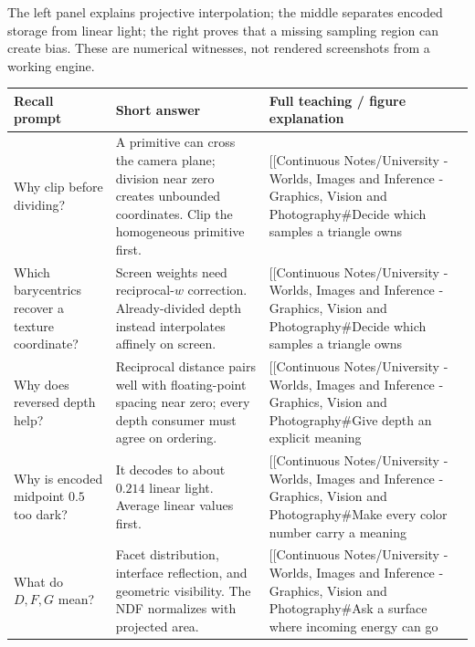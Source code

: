 The left panel explains projective interpolation; the middle separates encoded storage from linear light; the right proves that a missing sampling region can create bias. These are numerical witnesses, not rendered screenshots from a working engine.

{\def\LTcaptype{none} %
\begin{longtable}[]{@{}
  >{\raggedright\arraybackslash}p{}
  >{\raggedright\arraybackslash}p{}
  >{\raggedright\arraybackslash}p{}@{}}
\toprule\noalign{}
\begin{minipage}[b]{\linewidth}\raggedright
Recall prompt
\end{minipage} & \begin{minipage}[b]{\linewidth}\raggedright
Short answer
\end{minipage} & \begin{minipage}[b]{\linewidth}\raggedright
Full teaching / figure explanation
\end{minipage} \\
\midrule\noalign{}
\endhead
\bottomrule\noalign{}
\endlastfoot
Why clip before dividing? & A primitive can cross the camera plane; division near zero creates unbounded coordinates. Clip the homogeneous primitive first. & {[}{[}Continuous Notes/University - Worlds, Images and Inference - Graphics, Vision and Photography\#Decide which samples a triangle owns \\
Which barycentrics recover a texture coordinate? & Screen weights need reciprocal-\(w\) correction. Already-divided depth instead interpolates affinely on screen. & {[}{[}Continuous Notes/University - Worlds, Images and Inference - Graphics, Vision and Photography\#Decide which samples a triangle owns \\
Why does reversed depth help? & Reciprocal distance pairs well with floating-point spacing near zero; every depth consumer must agree on ordering. & {[}{[}Continuous Notes/University - Worlds, Images and Inference - Graphics, Vision and Photography\#Give depth an explicit meaning \\
Why is encoded midpoint \(0.5\) too dark? & It decodes to about \(0.214\) linear light. Average linear values first. & {[}{[}Continuous Notes/University - Worlds, Images and Inference - Graphics, Vision and Photography\#Make every color number carry a meaning \\
What do \(D,F,G\) mean? & Facet distribution, interface reflection, and geometric visibility. The NDF normalizes with projected area. & {[}{[}Continuous Notes/University - Worlds, Images and Inference - Graphics, Vision and Photography\#Ask a surface where incoming energy can go \\

\end{longtable}}

